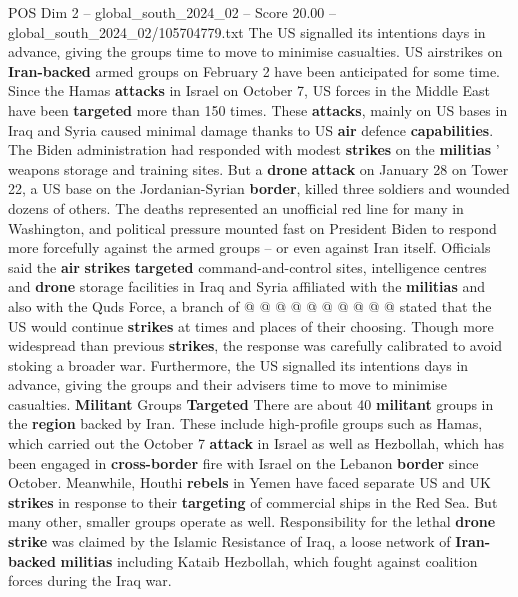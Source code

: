 \begin{textsample}{POS Dim 2 – global\_south\_2024\_02 – Score 20.00 – global\_south\_2024\_02/105704779.txt}  \label{ex:f2_pos_193}
The US signalled its intentions days in advance, giving the groups time to move to minimise casualties.
US airstrikes on \textbf{Iran-backed} armed groups on February 2 have been anticipated for some time.
Since the Hamas \textbf{attacks} in Israel on October 7, US forces in the Middle East have been \textbf{targeted} more than 150 times.
These \textbf{attacks}, mainly on US bases in Iraq and Syria caused minimal damage thanks to US \textbf{air} defence \textbf{capabilities}.
The Biden administration had responded with modest \textbf{strikes} on the \textbf{militias} ' weapons storage and training sites.
But a \textbf{drone} \textbf{attack} on January 28 on Tower 22, a US base on the Jordanian-Syrian \textbf{border}, killed three soldiers and wounded dozens of others.
The deaths represented an unofficial red line for many in Washington, and political pressure mounted fast on President Biden to respond more forcefully against the armed groups -- or even against Iran itself.
Officials said the \textbf{air} \textbf{strikes} \textbf{targeted} command-and-control sites, intelligence centres and \textbf{drone} storage facilities in Iraq and Syria affiliated with the \textbf{militias} and also with the Quds Force, a branch of @ @ @ @ @ @ @ @ @ @ stated that the US would continue \textbf{strikes} at times and places of their choosing.
Though more widespread than previous \textbf{strikes}, the response was carefully calibrated to avoid stoking a broader war.
Furthermore, the US signalled its intentions days in advance, giving the groups and their advisers time to move to minimise casualties. \textbf{Militant} Groups \textbf{Targeted} There are about 40 \textbf{militant} groups in the \textbf{region} backed by Iran.
These include high-profile groups such as Hamas, which carried out the October 7 \textbf{attack} in Israel as well as Hezbollah, which has been engaged in \textbf{cross-border} fire with Israel on the Lebanon \textbf{border} since October.
Meanwhile, Houthi \textbf{rebels} in Yemen have faced separate US and UK \textbf{strikes} in response to their \textbf{targeting} of commercial ships in the Red Sea.
But many other, smaller groups operate as well.
Responsibility for the lethal \textbf{drone} \textbf{strike} was claimed by the Islamic Resistance of Iraq, a loose network of \textbf{Iran-backed} \textbf{militias} including Kataib Hezbollah, which fought against coalition forces during the Iraq war.

\end{textsample}
